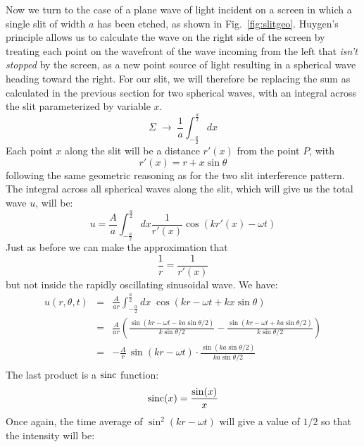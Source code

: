 \documentclass[12pt]{article}
\begin{document}
Now we turn to the case of a plane wave of light incident on a screen in which a single slit of width $a$ has been etched, as shown in Fig.~\ref{fig:slitgeo}.  Huygen's principle allows us to calculate the wave on the right side of the screen by treating each point on the wavefront of the wave incoming from the left that {\em isn't stopped} by the screen, as a new point source of light resulting in a spherical wave heading toward the right.  For our slit, we will therefore be replacing the sum as calculated in the previous section for two spherical waves, with an integral across the slit parameterized by variable $x$.
\begin{displaymath}
\Sigma \; \to \; \frac{1}{a}\int_{-\frac{a}{2}}^{\frac{a}{2}}dx
\end{displaymath}
Each point $x$ along the slit will be a distance $r'(x)$ from the point $P$, with
\begin{displaymath}
r'(x) = r + x \sin \theta
\end{displaymath}
following the same geometric reasoning as for the two slit interference pattern.  The integral across all spherical waves along the slit, which will give us the total wave $u$, will be:
\begin{displaymath}
u = \frac{A}{a} \int_{-\frac{a}{2}}^{\frac{a}{2}}dx \frac{1}{r'(x)}\cos(kr'(x) - \omega t)
\end{displaymath}
Just as before we can make the approximation that
\begin{displaymath}
\frac{1}{r} = \frac{1}{r'(x)} 
\end{displaymath}
but not inside the rapidly oscillating sinusoidal wave.  We have:
\begin{eqnarray*}
u(r,\theta,t) &=& \frac{A}{ar} \int_{-\frac{a}{2}}^{\frac{a}{2}}dx \; \cos(kr - \omega t + kx \sin \theta ) \\
&=& \frac{A}{ar} \left( \frac{\sin(kr - \omega t - ka \sin \theta/2 )}{k \sin \theta/2} - 
\frac{\sin(kr - \omega t + ka \sin \theta/2 )}{k \sin \theta/2} \right) \\
&=& -\frac{A}{r} \, \sin(kr-\omega t) \cdot \frac{\sin(k a \sin \theta / 2)}{k a \sin \theta / 2}\\
\end{eqnarray*}
The last product is a ${\rm sinc}$ function:
\begin{displaymath}
{\rm sinc}(x) = \frac{\sin(x)}{x}
\end{displaymath}
Once again, the time average of $\sin^2(kr-\omega t)$ will give a value of $1/2$ so that the intensity will be:
\end{document}
